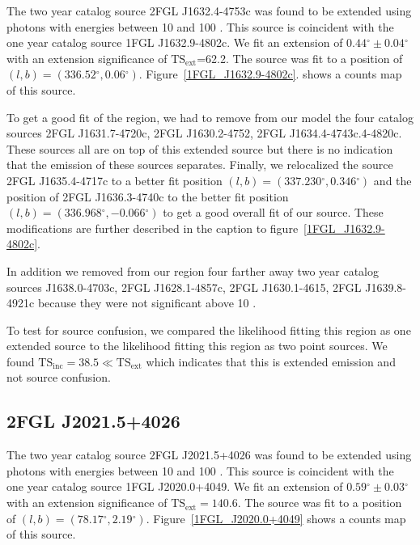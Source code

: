 \documentclass[12pt,preprint]{aastex}
\newcommand{\gev}{\text{GeV}\xspace}
\newcommand{\tsext}{{\ensuremath{\text{TS}_\text{ext}}}\xspace}
\newcommand{\tsinc}{\ensuremath{\text{TS}_\text{inc}}\xspace}
\renewcommand{\deg}{\ensuremath{^\circ}\xspace}
\begin{document}
The two year catalog source 2FGL J1632.4-4753c was found to be extended
using photons with energies between 10 \gev and 100 \gev.  This source
is coincident with the one year catalog source 1FGL J1632.9-4802c.
We fit an extension of $0.44\deg\pm0.04\deg$ with an extension
significance of \tsext=62.2.  The source was fit to a position
of $(l,b)=(336.52\deg,0.06\deg)$.  Figure~\ref{1FGL_J1632.9-4802c}.
shows a counts map of this source. 

To get a good fit of the region, we had to remove from our model
the four catalog sources 2FGL J1631.7-4720c, 2FGL J1630.2-4752,
2FGL J1634.4-4743c.4-4820c. These sources all are on top of this
extended source but there is no indication that the emission of these
sources separates.  Finally, we relocalized the
source 2FGL J1635.4-4717c to a better fit position $(l,b)=(337.230\deg,0.346\deg)$
and the position of 2FGL J1636.3-4740c to the better fit position
$(l,b)=(336.968\deg,-0.066\deg)$ to get a good overall fit of our source.
These modifications are further described in the caption to 
figure~\ref{1FGL_J1632.9-4802c}.

In addition we removed from our region four farther away two year
catalog sources J1638.0-4703c, 2FGL J1628.1-4857c, 2FGL  J1630.1-4615,
2FGL J1639.8-4921c because they were not significant above 10 \gev.

To test for source confusion, we compared the likelihood fitting this
region as one extended source to the likelihood fitting this region as
two point sources. We found $\tsinc=38.5\ll\tsext$ which indicates that
this is extended emission and not source confusion.


\subsection{2FGL J2021.5+4026}


The two year catalog source 2FGL J2021.5+4026 was found to be extended
using photons with energies between 10 \gev and 100 \gev. This source
is coincident with the one year catalog source 1FGL J2020.0+4049. We
fit an extension of $0.59\deg\pm0.03\deg$ with an extension
significance of $\tsext=140.6$.  The source was fit to a position of
$(l,b)=(78.17\deg,2.19\deg)$.  Figure~\ref{1FGL_J2020.0+4049} shows a
counts map of this source.
\end{document}
